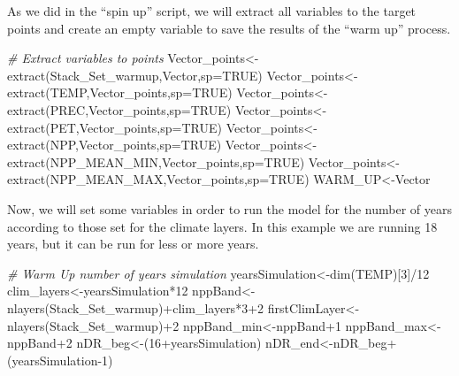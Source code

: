 \documentclass[
  10pt,
  b5paper,
]{book}
\newenvironment{Shaded}{\begin{snugshade}}{\end{snugshade}}
\newcommand{\AttributeTok}[1]{\textcolor[rgb]{0.77,0.63,0.00}{#1}}
\newcommand{\CommentTok}[1]{\textcolor[rgb]{0.56,0.35,0.01}{\textit{#1}}}
\newcommand{\ConstantTok}[1]{\textcolor[rgb]{0.00,0.00,0.00}{#1}}
\newcommand{\DecValTok}[1]{\textcolor[rgb]{0.00,0.00,0.81}{#1}}
\newcommand{\FunctionTok}[1]{\textcolor[rgb]{0.00,0.00,0.00}{#1}}
\newcommand{\NormalTok}[1]{#1}
\newcommand{\OtherTok}[1]{\textcolor[rgb]{0.56,0.35,0.01}{#1}}
\newcommand{\SpecialCharTok}[1]{\textcolor[rgb]{0.00,0.00,0.00}{#1}}
\begin{document}
As we did in the ``spin up'' script, we will extract all variables to the target points and create an empty variable to save the results of the ``warm up'' process.

\begin{Shaded}
\begin{Highlighting}[]
\CommentTok{\# Extract variables to points}
\NormalTok{Vector\_points}\OtherTok{\textless{}{-}}\FunctionTok{extract}\NormalTok{(Stack\_Set\_warmup,Vector,}\AttributeTok{sp=}\ConstantTok{TRUE}\NormalTok{)}
\NormalTok{Vector\_points}\OtherTok{\textless{}{-}}\FunctionTok{extract}\NormalTok{(TEMP,Vector\_points,}\AttributeTok{sp=}\ConstantTok{TRUE}\NormalTok{)}
\NormalTok{Vector\_points}\OtherTok{\textless{}{-}}\FunctionTok{extract}\NormalTok{(PREC,Vector\_points,}\AttributeTok{sp=}\ConstantTok{TRUE}\NormalTok{)}
\NormalTok{Vector\_points}\OtherTok{\textless{}{-}}\FunctionTok{extract}\NormalTok{(PET,Vector\_points,}\AttributeTok{sp=}\ConstantTok{TRUE}\NormalTok{)}
\NormalTok{Vector\_points}\OtherTok{\textless{}{-}}\FunctionTok{extract}\NormalTok{(NPP,Vector\_points,}\AttributeTok{sp=}\ConstantTok{TRUE}\NormalTok{)}
\NormalTok{Vector\_points}\OtherTok{\textless{}{-}}\FunctionTok{extract}\NormalTok{(NPP\_MEAN\_MIN,Vector\_points,}\AttributeTok{sp=}\ConstantTok{TRUE}\NormalTok{)}
\NormalTok{Vector\_points}\OtherTok{\textless{}{-}}\FunctionTok{extract}\NormalTok{(NPP\_MEAN\_MAX,Vector\_points,}\AttributeTok{sp=}\ConstantTok{TRUE}\NormalTok{)}
\NormalTok{WARM\_UP}\OtherTok{\textless{}{-}}\NormalTok{Vector}
\end{Highlighting}
\end{Shaded}

Now, we will set some variables in order to run the model for the number of years according to those set for the climate layers. In this example we are running 18 years, but it can be run for less or more years.

\begin{Shaded}
\begin{Highlighting}[]
\CommentTok{\# Warm Up number of years simulation }
\NormalTok{yearsSimulation}\OtherTok{\textless{}{-}}\FunctionTok{dim}\NormalTok{(TEMP)[}\DecValTok{3}\NormalTok{]}\SpecialCharTok{/}\DecValTok{12}
\NormalTok{clim\_layers}\OtherTok{\textless{}{-}}\NormalTok{yearsSimulation}\SpecialCharTok{*}\DecValTok{12}
\NormalTok{nppBand}\OtherTok{\textless{}{-}}\FunctionTok{nlayers}\NormalTok{(Stack\_Set\_warmup)}\SpecialCharTok{+}\NormalTok{clim\_layers}\SpecialCharTok{*}\DecValTok{3}\SpecialCharTok{+}\DecValTok{2}
\NormalTok{firstClimLayer}\OtherTok{\textless{}{-}}\FunctionTok{nlayers}\NormalTok{(Stack\_Set\_warmup)}\SpecialCharTok{+}\DecValTok{2}
\NormalTok{nppBand\_min}\OtherTok{\textless{}{-}}\NormalTok{nppBand}\SpecialCharTok{+}\DecValTok{1}
\NormalTok{nppBand\_max}\OtherTok{\textless{}{-}}\NormalTok{nppBand}\SpecialCharTok{+}\DecValTok{2}
\NormalTok{nDR\_beg}\OtherTok{\textless{}{-}}\NormalTok{(}\DecValTok{16}\SpecialCharTok{+}\NormalTok{yearsSimulation)}
\NormalTok{nDR\_end}\OtherTok{\textless{}{-}}\NormalTok{nDR\_beg}\SpecialCharTok{+}\NormalTok{(yearsSimulation}\DecValTok{{-}1}\NormalTok{)}
\end{Highlighting}
\end{Shaded}
\end{document}

